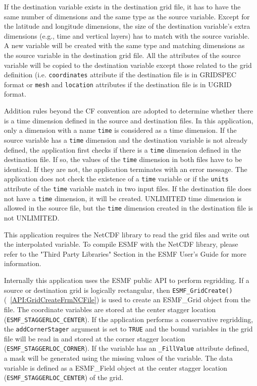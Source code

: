 If the destination 
variable exists in the destination grid file, it has to have the same number of dimensions and the same type as the source variable. Except for the latitude and longitude dimensions, the size of 
the destination variable's extra dimensions (e.g., time and vertical layers) has to match with the 
source variable.   A
new variable will be created with the same type and matching dimensions as the source variable in the destination grid file.
All the attributes of the source variable will be copied to the destination variable except those
related to the grid definition (i.e. {\tt coordinates} attribute if the destination file is in  
GRIDSPEC format or {\tt mesh} and {\tt location} attributes if the destination file is in UGRID format.

Addition rules beyond the CF convention are adopted to determine whether there is a time dimension defined
in the source and destination files.  In this application, only a dimension with a name {\tt time} is 
considered as a time dimension.
If the source variable has a {\tt time} dimension and the destination variable is not already defined, 
the application first checks if there is a {\tt time} dimension defined in the destination file.  If so, 
the values of the {\tt time} dimension in both files have to be identical.  If they are not, the application
terminates with an error message.  The application does not check the existence of a {\tt time} variable 
or if the {\tt units} attribute of the {\tt time} variable match in two input files.  If the destination 
file does not have a {\tt time} dimension, it will be created.  UNLIMITED time dimension is allowed in the
source file, but the {\tt time} dimension created in the destination file is not UNLIMITED.

This application requires the NetCDF library to read the grid files and write out the interpolated variable.  To compile ESMF with
the NetCDF library, please refer to the "Third Party Libraries" Section in the ESMF User's Guide for more information.

Internally this application uses the ESMF public API to perform regridding.
If a source or destination grid is logically rectangular, then {\tt ESMF\_GridCreate()}(~\ref{API:GridCreateFrmNCFile}) is used to create an ESMF\_Grid object from the file. The coordinate variables are stored
at the center stagger location ({\tt ESMF\_STAGGERLOC\_CENTER}).  If the application performs a 
conservative regridding, the {\tt addCornerStager} argument is set to {\tt TRUE} and the bound variables in the grid file will
be read  in and stored at the corner stagger location ({\tt ESMF\_STAGGERLOC\_CORNER}).  If the variable has an {\tt \_FillValue} attribute defined, a mask will be generated using the missing values of the variable. 
The data variable is defined as a ESMF\_Field object at the center stagger location ({\tt ESMF\_STAGGERLOC\_CENTER}) of the grid.   

